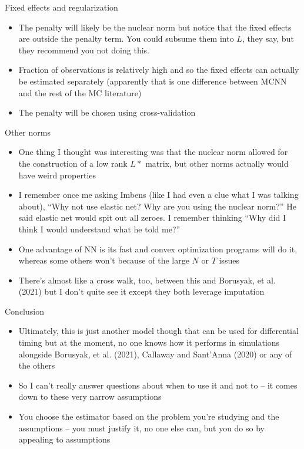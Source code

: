 \documentclass{beamer}
\begin{document}
\begin{frame}{Fixed effects and regularization}

\begin{itemize}
\item The penalty will likely be the nuclear norm but notice that the fixed effects are outside the penalty term.  You could subsume them into $L$, they say, but they recommend you not doing this.
\item Fraction of observations is relatively high and so the fixed effects can actually be estimated separately (apparently that is one difference between MCNN and the rest of the MC literature)
\item The penalty will be chosen using cross-validation
\end{itemize}

\end{frame}

\begin{frame}{Other norms}

\begin{itemize}
\item One thing I thought was interesting was that the nuclear norm allowed for the construction of a low rank $L*$ matrix, but other norms actually would have weird properties
\item I remember once me asking Imbens (like I had even a clue what I was talking about), ``Why not use elastic net?  Why are you using the nuclear norm?'' He said elastic net would spit out all zeroes.  I remember thinking ``Why did I think I would understand what he told me?''
\item One advantage of NN is its fast and convex optimization programs will do it, whereas some others won't because of the large $N$ or $T$ issues
\item There's almost like a cross walk, too, between this and Borusyak, et al. (2021) but I don't quite see it except they both leverage imputation
\end{itemize}
\end{frame}

\begin{frame}{Conclusion}

\begin{itemize}
\item Ultimately, this is just another model though that can be used for differential timing but at the moment, no one knows how it performs in simulations alongside Borusyak, et al. (2021), Callaway and Sant'Anna (2020) or any of the others
\item So I can't really answer questions about when to use it and not to -- it comes down to these very narrow assumptions
\item You choose the estimator based on the problem you're studying and the assumptions -- you must justify it, no one else can, but you do so by appealing to assumptions
\end{itemize}

\end{frame}
\end{document}

